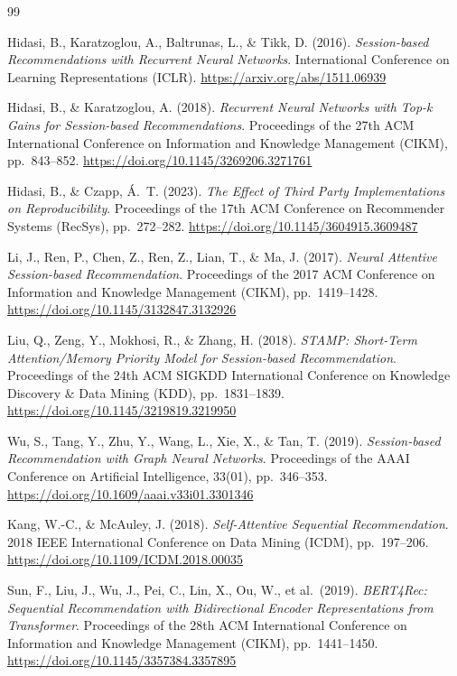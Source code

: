 \begin{thebibliography}{99}

Hidasi, B., Karatzoglou, A., Baltrunas, L., \& Tikk, D. (2016).
\textit{Session-based Recommendations with Recurrent Neural Networks}.
International Conference on Learning Representations (ICLR). \url{https://arxiv.org/abs/1511.06939}

Hidasi, B., \& Karatzoglou, A. (2018).
\textit{Recurrent Neural Networks with Top-k Gains for Session-based Recommendations}.
Proceedings of the 27th ACM International Conference on Information and Knowledge Management (CIKM), pp.\ 843--852. \url{https://doi.org/10.1145/3269206.3271761}

Hidasi, B., \& Czapp, \'{A}.~T. (2023).
\textit{The Effect of Third Party Implementations on Reproducibility}.
Proceedings of the 17th ACM Conference on Recommender Systems (RecSys), pp.\ 272--282. \url{https://doi.org/10.1145/3604915.3609487}

Li, J., Ren, P., Chen, Z., Ren, Z., Lian, T., \& Ma, J. (2017).
\textit{Neural Attentive Session-based Recommendation}.
Proceedings of the 2017 ACM Conference on Information and Knowledge Management (CIKM), pp.\ 1419--1428. \url{https://doi.org/10.1145/3132847.3132926}

Liu, Q., Zeng, Y., Mokhosi, R., \& Zhang, H. (2018).
\textit{STAMP: Short-Term Attention/Memory Priority Model for Session-based Recommendation}.
Proceedings of the 24th ACM SIGKDD International Conference on Knowledge Discovery \& Data Mining (KDD), pp.\ 1831--1839. \url{https://doi.org/10.1145/3219819.3219950}

Wu, S., Tang, Y., Zhu, Y., Wang, L., Xie, X., \& Tan, T. (2019).
\textit{Session-based Recommendation with Graph Neural Networks}.
Proceedings of the AAAI Conference on Artificial Intelligence, 33(01), pp.\ 346--353. \url{https://doi.org/10.1609/aaai.v33i01.3301346}

Kang, W.-C., \& McAuley, J. (2018).
\textit{Self-Attentive Sequential Recommendation}.
2018 IEEE International Conference on Data Mining (ICDM), pp.\ 197--206. \url{https://doi.org/10.1109/ICDM.2018.00035}

Sun, F., Liu, J., Wu, J., Pei, C., Lin, X., Ou, W., et al.\ (2019).
\textit{BERT4Rec: Sequential Recommendation with Bidirectional Encoder Representations from Transformer}.
Proceedings of the 28th ACM International Conference on Information and Knowledge Management (CIKM), pp.\ 1441--1450. \url{https://doi.org/10.1145/3357384.3357895}


\end{thebibliography}
